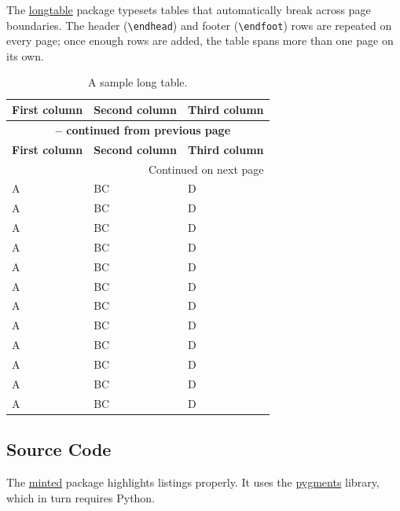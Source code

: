 The \href{https://ctan.org/pkg/longtable}{longtable} package typesets tables that automatically break across page boundaries.
The header (\verb+\endhead+) and footer (\verb+\endfoot+) rows are repeated on every page; once enough rows are added, the table spans more than one page on its own.

\begin{ltgexample}
\begin{longtable}{lll}
  \caption{A sample long table.}\label{tab:long} \\
  \toprule
  \textbf{First column} & \textbf{Second column} & \textbf{Third column} \\
  \midrule
  \endfirsthead

  \multicolumn{3}{c}{{\bfseries \tablename\ \thetable{} -- continued from previous page}} \\
  \toprule
  \textbf{First column} & \textbf{Second column} & \textbf{Third column} \\
  \midrule
  \endhead

  \midrule
  \multicolumn{3}{r}{{Continued on next page}} \\
  \endfoot

  \bottomrule
  \endlastfoot

  A & BC & D \\
  A & BC & D \\
  A & BC & D \\
  A & BC & D \\
  A & BC & D \\
  A & BC & D \\
  A & BC & D \\
  A & BC & D \\
  A & BC & D \\
  A & BC & D \\
  A & BC & D \\
  A & BC & D \\
\end{longtable}
\end{ltgexample}

\subsection{Source Code}

The \href{https://github.com/gpoore/minted}{minted} package highlights listings properly.
It uses the \href{http://pygments.org/}{pygments} library, which in turn requires Python.

